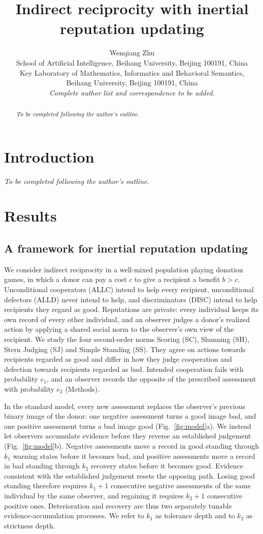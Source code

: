 \documentclass[fleqn,10pt]{article}
\title{Indirect reciprocity with inertial reputation updating}
\author{Wenqiang Zhu\\[0.5em]
\small School of Artificial Intelligence, Beihang University, Beijing 100191, China\\
\small Key Laboratory of Mathematics, Informatics and Behavioral Semantics,\\
\small Beihang University, Beijing 100191, China\\[0.5em]
\small\textit{Complete author list and correspondence to be added.}}
\date{}
\begin{document}
\raggedbottom
\maketitle
\begin{abstract}
\textit{To be completed following the author's outline.}
\end{abstract}
\section*{Introduction}
\textit{To be completed following the author's outline.}
\section*{Results}
\subsection*{A framework for inertial reputation updating}

We consider indirect reciprocity in a well-mixed population playing donation games, in which a donor can pay a cost $c$ to give a recipient a benefit $b>c$. Unconditional cooperators (ALLC) intend to help every recipient, unconditional defectors (ALLD) never intend to help, and discriminators (DISC) intend to help recipients they regard as good. Reputations are private: every individual keeps its own record of every other individual, and an observer judges a donor's realized action by applying a shared social norm to the observer's own view of the recipient. We study the four second-order norms Scoring (SC), Shunning (SH), Stern Judging (SJ) and Simple Standing (SS). They agree on actions towards recipients regarded as good and differ in how they judge cooperation and defection towards recipients regarded as bad. Intended cooperation fails with probability $e_1$, and an observer records the opposite of the prescribed assessment with probability $e_2$ (Methods).

In the standard model, every new assessment replaces the observer's previous binary image of the donor: one negative assessment turns a good image bad, and one positive assessment turns a bad image good (Fig.~\ref{fig:model}a). We instead let observers accumulate evidence before they reverse an established judgement (Fig.~\ref{fig:model}b). Negative assessments move a record in good standing through $k_1$ warning states before it becomes bad, and positive assessments move a record in bad standing through $k_2$ recovery states before it becomes good. Evidence consistent with the established judgement resets the opposing path. Losing good standing therefore requires $k_1+1$ consecutive negative assessments of the same individual by the same observer, and regaining it requires $k_2+1$ consecutive positive ones. Deterioration and recovery are thus two separately tunable evidence-accumulation processes. We refer to $k_1$ as tolerance depth and to $k_2$ as strictness depth.
\end{document}
